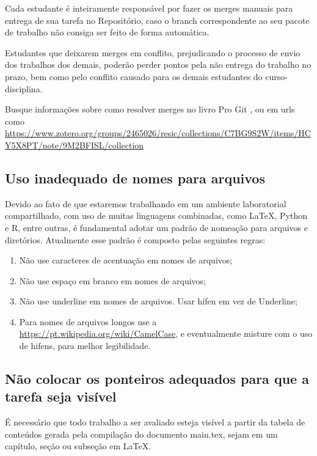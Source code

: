 Cada estudante é inteiramente responsável por fazer os merges manuais para entrega de sua tarefa no Repositório, caso o branch correspondente ao seu pacote de trabalho não consiga ser feito de forma automática. 

Estudantes que deixarem merges em conflito, prejudicando o processo de envio dos trabalhos dos demais, poderão perder pontos pela não entrega do trabalho no prazo, bem como pelo conflito causado para os demais estudantes do curso-disciplina. 

Busque informações sobre como resolver merges no livro Pro Git \cite{chacon_pro_2014}, ou em  urls como \url{https://www.zotero.org/groups/2465026/resic/collections/C7BG9S2W/items/HCY5X8PT/note/9M2BFISL/collection}

\subsection{Uso inadequado de nomes para arquivos}

Devido ao fato de que estaremos trabalhando em um ambiente laboratorial compartilhado, com uso de muitas linguagens combinadas, como \LaTeX, Python e R, entre outras, é fundamental adotar um padrão de nomeação para arquivos e diretórios. Atualmente esse padrão é composto pelas seguintes regras:
\begin{enumerate}
    \item Não use caracteres de acentuação em nomes de arquivos;
    \item Não use espaço em branco em nomes de arquivos;
    \item Não use underline em nomes de arquivos. Usar hífen em vez de Underline;
    \item Para nomes de arquivos longos use a \url{https://pt.wikipedia.org/wiki/CamelCase}, e eventualmente misture com o uso de hifens, para melhor legibilidade.
\end{enumerate}

\subsection{Não colocar os ponteiros adequados para que a tarefa seja visível}

É necessário que todo trabalho a ser avaliado esteja visível a partir da tabela de conteúdos gerada pela compilação do documento main.tex, sejam em um capítulo, seção ou subseção em \LaTeX.

